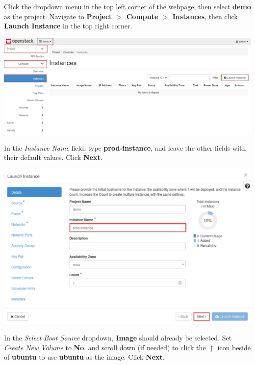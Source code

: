 \documentclass[letterpaper, 12pt]{article}
\begin{document}
\begin{enumerate}
    \begin{labstep}
        Click the dropdown menu in the top left corner of the webpage, then select \textbf{demo} as the project.
        Navigate to \textbf{Project $>$ Compute $>$ Instances}, then click \textbf{Launch Instance} in the top right corner.

        \begin{center}
            \includegraphics[width=\linewidth]{images/part1/step5.png}
        \end{center}
    \end{labstep}

    \begin{labstep}
        In the \textit{Instance Name} field, type \textbf{prod-instance}, and leave the other fields with their default values.
        Click \textbf{Next}.

        \begin{center}
            \includegraphics[width=\linewidth]{images/part1/step6.png}
        \end{center}
    \end{labstep}

    \begin{labstep}
        In the \textit{Select Boot Source} dropdown, \textbf{Image} should already be selected.
        Set \textit{Create New Volume} to \textbf{No}, and scroll down (if needed) to click the $\uparrow$ icon beside of \textbf{ubuntu} to use \textbf{ubuntu} as the image.
        Click \textbf{Next}.


\end{labstep}
\end{enumerate}
\end{document}
